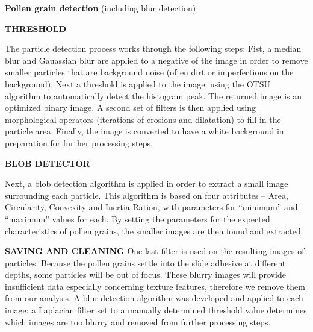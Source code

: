 \textbf{Pollen grain detection} (including blur detection)


\textbf{THRESHOLD}

The particle detection process works through the following steps: Fist, a median blur and Gauassian blur are applied to a negative of the image in order to remove smaller particles that are background noise (often dirt or imperfections on the background). 
Next a threshold is applied to the image, using the OTSU algorithm to automatically detect the histogram peak. The returned image is an optimized binary image. A second set of filters is then applied using morphological operators (iterations of erosions and dilatation) to fill in the particle area. Finally, the image is converted to have a white background in preparation for further processing steps.


\textbf{BLOB DETECTOR}

Next, a blob detection algorithm is applied in order to extract a small image surrounding each particle. This algorithm is based on four attributes – Area, Circularity, Convexity and Inertia Ration, with parameters for “minimum” and “maximum” values for each. By setting the parameters for the expected characteristics of pollen grains, the smaller images are then found and extracted.

\textbf{SAVING AND CLEANING}
One last filter is used on the resulting images of particles. Because the pollen grains settle into the slide adhesive at different depths, some particles will be out of focus. These blurry images will provide insufficient data especially concerning texture features, therefore we remove them from our analysis. A blur detection algorithm was developed and applied to each image: a Laplacian filter set to a manually determined threshold value determines which images are too blurry and removed from further processing steps. 

    
    
    
    
  